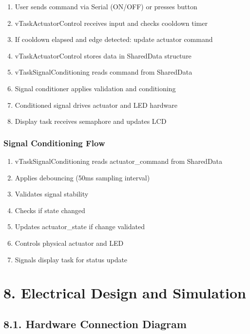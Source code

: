 \documentclass[12pt]{article}
\begin{document}
\begin{enumerate}
    \item User sends command via Serial (ON/OFF) or presses button
    \item vTaskActuatorControl receives input and checks cooldown timer
    \item If cooldown elapsed and edge detected: update actuator command
    \item vTaskActuatorControl stores data in SharedData structure
    \item vTaskSignalConditioning reads command from SharedData
    \item Signal conditioner applies validation and conditioning
    \item Conditioned signal drives actuator and LED hardware
    \item Display task receives semaphore and updates LCD
\end{enumerate}

\subsubsection*{Signal Conditioning Flow}

\begin{enumerate}
    \item vTaskSignalConditioning reads actuator\_command from SharedData
    \item Applies debouncing (50ms sampling interval)
    \item Validates signal stability
    \item Checks if state changed
    \item Updates actuator\_state if change validated
    \item Controls physical actuator and LED
    \item Signals display task for status update
\end{enumerate}




\section*{8. Electrical Design and Simulation}

\subsection*{8.1. Hardware Connection Diagram}
\end{document}
